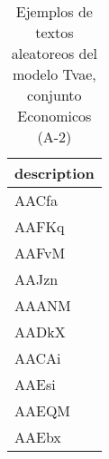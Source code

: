 \begin{table}[H]
\centering
\fontsize{8}{14}\selectfont
\caption{Ejemplos de textos aleatoreos del modelo Tvae, conjunto Economicos (A-2)}
\label{table-sample10-economicos-a-2-tvae-text}
\begin{tabular}{|m{50em}|}
\hline
\rowcolor[gray]{0.8}
description \\
\hline AACfa \\
\hline AAFKq \\
\hline AAFvM \\
\hline AAJzn \\
\hline AAANM \\
\hline AADkX \\
\hline AACAi \\
\hline AAEsi \\
\hline AAEQM \\
\hline AAEbx \\
\hline
\end{tabular}
\end{table}
